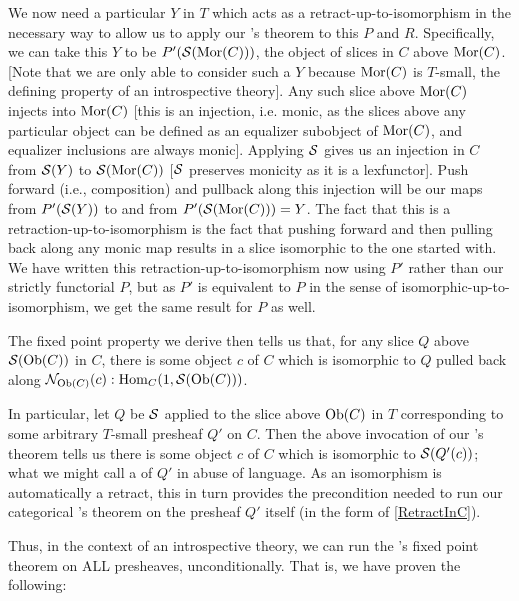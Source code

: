 We now need a particular $Y$ in $T$ which acts as a retract-up-to-isomorphism in the necessary way to allow us to apply our \Loeb's theorem to this $P$ and $R$. Specifically, we can take this $Y$ to be $P'(\mathcal{S}(\operatorname{Mor}(C)))$, the object of slices in $C$ above $\operatorname{Mor}(C)$. [Note that we are only able to consider such a $Y$ because $\operatorname{Mor}(C)$ is $T$-small, the defining property of an introspective theory]. Any such slice above $\operatorname{Mor}(C)$ injects into $\operatorname{Mor}(C)$ [this is an injection, i.e. monic, as the slices above any particular object can be defined as an equalizer subobject of $\operatorname{Mor}(C)$, and equalizer inclusions are always monic]. Applying $\mathcal{S}$ gives us an injection in $C$ from $\mathcal{S}(Y)$ to $\mathcal{S}(\operatorname{Mor}(C))$ [$\mathcal{S}$ preserves monicity as it is a lexfunctor]. Push forward (i.e., composition) and pullback along this injection will be our maps from $P'(\mathcal{S}(Y))$ to and from $P'(\mathcal{S}(\operatorname{Mor}(C))) = Y$. The fact that this is a retraction-up-to-isomorphism is the fact that pushing forward and then pulling back along any monic map results in a slice isomorphic to the one started with. We have written this retraction-up-to-isomorphism now using $P'$ rather than our strictly functorial $P$, but as $P'$ is equivalent to $P$ in the sense of isomorphic-up-to-isomorphism, we get the same result for $P$ as well. 

The fixed point property we derive then tells us that, for any slice $Q$ above $\mathcal{S}(\operatorname{Ob}(C))$ in $C$, there is some object $c$ of $C$ which is isomorphic to $Q$ pulled back along $\mathcal{N}_{\operatorname{Ob}(C)}(c) : \operatorname{Hom}_C(1, \mathcal{S}(\operatorname{Ob}(C)))$. 

In particular, let $Q$ be $\mathcal{S}$ applied to the slice above $\operatorname{Ob}(C)$ in $T$ corresponding to some arbitrary $T$-small presheaf $Q'$ on $C$. Then the above invocation of our \Loeb's theorem tells us there is some object $c$ of $C$ which is isomorphic to $\mathcal{S}(Q'(c))$; what we might call a  of $Q'$ in abuse of language. As an isomorphism is automatically a retract, this in turn provides the precondition needed to run our categorical \Loeb's theorem on the presheaf $Q'$ itself (in the form of \cref{RetractInC}).

Thus, in the context of an introspective theory, we can run the \Loeb's fixed point theorem on ALL presheaves, unconditionally. That is, we have proven the following:

